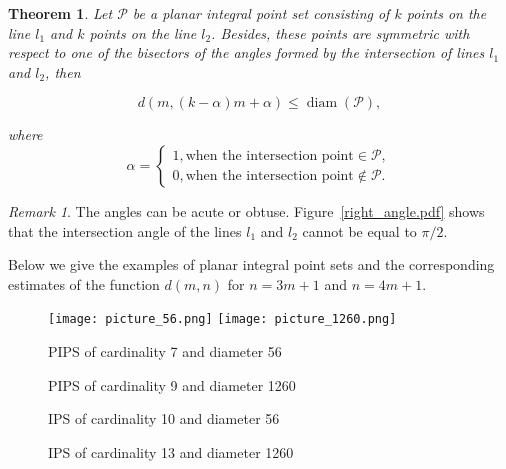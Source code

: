 \documentclass[12pt]{article}
\theoremstyle{theorem}
\newtheorem{theorem}{Theorem}
\theoremstyle{dfn}
\theoremstyle{remark}
\newtheorem{remark}{Remark}
\begin{document}
\begin{theorem}
Let $\mathcal{P}$ be a planar integral point set consisting of $k$
points on the line $l_{1}$ and $k$ points on the line $l_{2}$. Besides, these
points are symmetric with respect to one of the bisectors of the angles
formed by the intersection of lines $l_{1}$ and $l_{2}$, then

\begin{equation}\label{formula2}
d(m, (k - \alpha)m + \alpha) \leq \operatorname{diam}(\mathcal{P}),
\end{equation}

where
\begin{equation*}
\alpha =
\begin{cases}
1, \text{when the intersection point} \in \mathcal{P}, \\
0, \text{when the intersection point} \notin \mathcal{P}.
\end{cases}
\end{equation*}

\end{theorem}

\begin{remark}
The angles can be acute or obtuse. Figure~\ref{right_angle.pdf} shows that the intersection angle of the lines $l_{1}$ and $l_{2}$ cannot be equal to ${\pi}/2$.
\end{remark}

Below we give the examples of planar integral point sets and the corresponding
estimates of the function $d(m, n)$ for $n = 3m + 1$ and $n = 4m + 1$.

\begin{figure}[htbp]
	\texttt{[image: picture\_56.png]}
	\hfill
	\texttt{[image: picture\_1260.png]}
	\\
	\parbox{.48\linewidth}{\caption{PIPS of cardinality 7 and diameter 56}
	\label{picture_56.png}}
	\hfill
	\parbox{.48\linewidth}{\caption{PIPS of cardinality 9 and diameter 1260}
	\label{picture_1260.png}}
\end{figure}

\begin{figure}[h!]
\parbox{1\linewidth}{\caption{IPS of cardinality 10 and diameter 56}
\label{picture_12.pdf}}
\end{figure}

\begin{figure}[h!]
\parbox{1\linewidth}{\caption{IPS of cardinality 13 and diameter 1260}
\label{picture_1260_R3.pdf}}
\end{figure}
\end{document}

